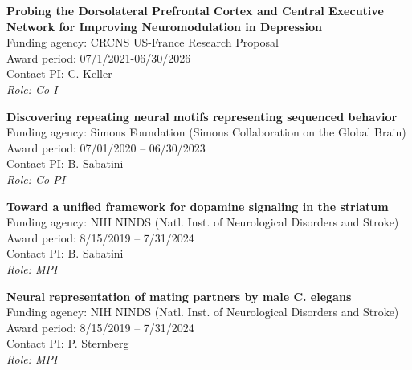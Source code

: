 \documentclass[10pt]{article}
\begin{document}
\begin{outerlist}
\item \textbf{Probing the Dorsolateral Prefrontal Cortex and Central Executive Network for Improving Neuromodulation in Depression} \\
  Funding agency: CRCNS US-France Research Proposal \\
  Award period: 07/1/2021-06/30/2026 \\
  Contact PI: C. Keller  \\
  \textit{Role: Co-I}

\item \textbf{Discovering repeating neural motifs representing sequenced behavior} \\
  Funding agency: Simons Foundation (Simons Collaboration on the Global Brain) \\
  Award period: 07/01/2020 -- 06/30/2023 \\
  Contact PI: B. Sabatini \\
  \textit{Role: Co-PI}


\item \textbf{Toward a unified framework for dopamine signaling in the striatum} \\
  Funding agency: NIH NINDS (Natl. Inst. of Neurological Disorders and Stroke) \\
  Award period: 8/15/2019 -- 7/31/2024 \\
  Contact PI: B. Sabatini \\
  \textit{Role: MPI}

\item \textbf{Neural representation of mating partners by male C. elegans}\\
  Funding agency: NIH NINDS (Natl. Inst. of Neurological Disorders and Stroke) \\
  Award period: 8/15/2019 -- 7/31/2024 \\
  Contact PI: P. Sternberg\\
  \textit{Role: MPI}

\end{outerlist}
\end{document}
